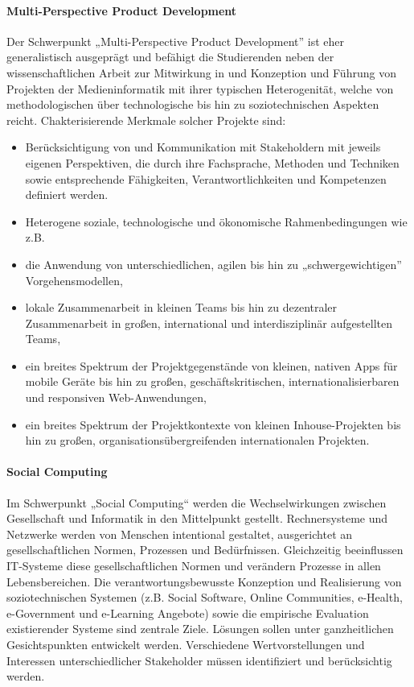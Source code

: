 \paragraph{Multi-Perspective Product
Development}\label{multi-perspective-product-development}

Der Schwerpunkt „Multi-Perspective Product Development'' ist eher
generalistisch ausgeprägt und befähigt die Studierenden neben der
wissenschaftlichen Arbeit zur Mitwirkung in und Konzeption und Führung
von Projekten der Medieninformatik mit ihrer typischen Heterogenität,
welche von methodologischen über technologische bis hin zu
soziotechnischen Aspekten reicht. Chakterisierende Merkmale solcher
Projekte sind:

\begin{itemize}
\tightlist
\item
  Berücksichtigung von und Kommunikation mit Stakeholdern mit jeweils
  eigenen Perspektiven, die durch ihre Fachsprache, Methoden und
  Techniken sowie entsprechende Fähigkeiten, Verantwortlichkeiten und
  Kompetenzen definiert werden.
\item
  Heterogene soziale, technologische und ökonomische Rahmenbedingungen
  wie z.B.
\item
  die Anwendung von unterschiedlichen, agilen bis hin zu
  „schwergewichtigen'' Vorgehensmodellen,
\item
  lokale Zusammenarbeit in kleinen Teams bis hin zu dezentraler
  Zusammenarbeit in großen, international und interdisziplinär
  aufgestellten Teams,
\item
  ein breites Spektrum der Projektgegenstände von kleinen, nativen Apps
  für mobile Geräte bis hin zu großen, geschäftskritischen,
  internationalisierbaren und responsiven Web-Anwendungen,
\item
  ein breites Spektrum der Projektkontexte von kleinen Inhouse-Projekten
  bis hin zu großen, organisationsübergreifenden internationalen
  Projekten.
\end{itemize}

\paragraph{Social Computing}\label{social-computing}

Im Schwerpunkt „Social Computing`` werden die Wechselwirkungen zwischen
Gesellschaft und Informatik in den Mittelpunkt gestellt. Rechnersysteme
und Netzwerke werden von Menschen intentional gestaltet, ausgerichtet an
gesellschaftlichen Normen, Prozessen und Bedürfnissen. Gleichzeitig
beeinflussen IT-Systeme diese gesellschaftlichen Normen und verändern
Prozesse in allen Lebensbereichen. Die verantwortungsbewusste Konzeption
und Realisierung von soziotechnischen Systemen (z.B. Social Software,
Online Communities, e-Health, e-Government und e-Learning Angebote)
sowie die empirische Evaluation existierender Systeme sind zentrale
Ziele. Lösungen sollen unter ganzheitlichen Gesichtspunkten entwickelt
werden. Verschiedene Wertvorstellungen und Interessen unterschiedlicher
Stakeholder müssen identifiziert und berücksichtig werden.

